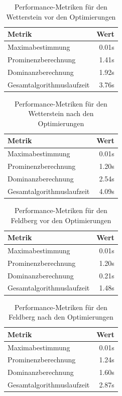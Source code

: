 \begin{table}[htbp]
\centering
\caption{Performance-Metriken für den Wetterstein vor den Optimierungen}
\label{tab:performance_wetterstein_before}
\begin{tabular}{|l|r|}
\hline
Metrik & Wert \\
\hline
Maximabestimmung & 0.01s \\
\hline
Prominenzberechnung & 1.41s \\
\hline
Dominanzberechnung & 1.92s \\
\hline
Gesamtalgorithmuslaufzeit & 3.76s \\
\hline
\end{tabular}
\end{table}

\begin{table}[htbp]
\centering
\caption{Performance-Metriken für den Wetterstein nach den Optimierungen}
\label{tab:performance_wetterstein_after}
\begin{tabular}{|l|r|}
\hline
Metrik & Wert \\
\hline
Maximabestimmung & 0.01s \\
\hline
Prominenzberechnung & 1.20s \\
\hline
Dominanzberechnung & 2.54s \\
\hline
Gesamtalgorithmuslaufzeit & 4.09s \\
\hline
\end{tabular}
\end{table}

\begin{table}[htbp]
\centering
\caption{Performance-Metriken für den Feldberg vor den Optimierungen}
\label{tab:performance_feldberg_before}
\begin{tabular}{|l|r|}
\hline
Metrik & Wert \\
\hline
Maximabestimmung & 0.01s \\
\hline
Prominenzberechnung & 1.20s \\
\hline
Dominanzberechnung & 0.21s \\
\hline
Gesamtalgorithmuslaufzeit & 1.48s \\
\hline
\end{tabular}
\end{table}

\begin{table}[htbp]
\centering
\caption{Performance-Metriken für den Feldberg nach den Optimierungen}
\label{tab:performance_feldberg_after}
\begin{tabular}{|l|r|}
\hline
Metrik & Wert \\
\hline
Maximabestimmung & 0.01s \\
\hline
Prominenzberechnung & 1.24s \\
\hline
Dominanzberechnung & 1.60s \\
\hline
Gesamtalgorithmuslaufzeit & 2.87s \\
\hline
\end{tabular}
\end{table}

